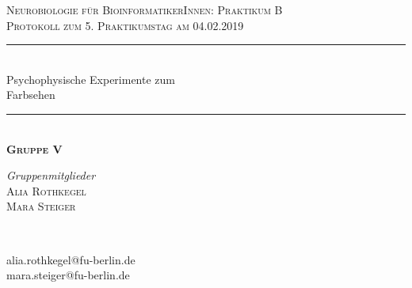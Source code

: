 \documentclass[11pt]{article}
\begin{document}
\begin{titlepage} %
	\newcommand{\HRule}{\rule{\linewidth}{0.5mm}} %
	
	\center %
	\vspace*{0.75cm}

	
	\textsc{\Large Neurobiologie für BioinformatikerInnen: Praktikum B}\\[0.65cm] %
	
	\textsc{\large Protokoll zum 5. Praktikumstag am 04.02.2019}\\[0.65cm] %

	\HRule\\[0.5cm]
	
	{\huge Psychophysische Experimente zum \\[0.2cm]Farbsehen}\\[0.3cm] %
	
	\HRule\\[0.75cm]
	\textsc{\Large\bfseries Gruppe V}
	\\[0.8cm]
	
\vfill

	\begin{minipage}{0.45\textwidth}
		\begin{flushleft}
			\large
			\textit{Gruppenmitglieder}\\
			\textsc{Alia Rothkegel}\\
			\textsc{Mara Steiger}
		\end{flushleft}
	\end{minipage}
	~
	\begin{minipage}{0.45\textwidth}
		\begin{flushright}
			\large \vspace{16pt}
			alia.rothkegel@fu-berlin.de\\
			mara.steiger@fu-berlin.de 
		\end{flushright}
	\end{minipage}
	
\vfill


\end{titlepage}
\end{document}
